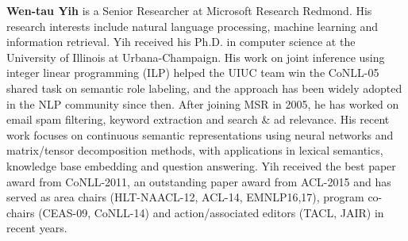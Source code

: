   {\bfseries Wen-tau Yih} is a Senior Researcher at Microsoft Research Redmond. His research interests include natural language processing, machine learning and information retrieval. Yih received his Ph.D. in computer science at the University of Illinois at Urbana-Champaign. His work on joint inference using integer linear programming (ILP) helped the UIUC team win the CoNLL-05 shared task on semantic role labeling, and the approach has been widely adopted in the NLP community since then. After joining MSR in 2005, he has worked on email spam filtering, keyword extraction and search \& ad relevance. His recent work focuses on continuous semantic representations using neural networks and matrix/tensor decomposition methods, with applications in lexical semantics, knowledge base embedding and question answering. Yih received the best paper award from CoNLL-2011, an outstanding paper award from ACL-2015 and has served as area chairs (HLT-NAACL-12, ACL-14, EMNLP16,17), program co-chairs (CEAS-09, CoNLL-14) and action/associated editors (TACL, JAIR) in recent years.
